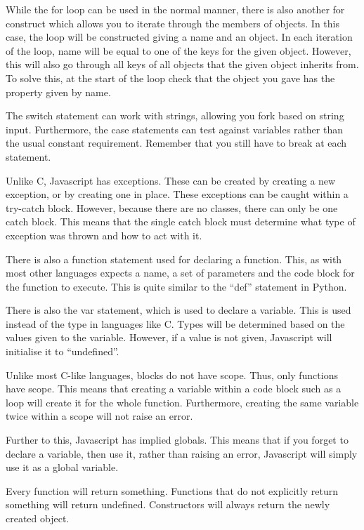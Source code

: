 			While the for loop can be used in the normal manner, 
			there is also another for construct which allows you to iterate through the members of objects. 
			In this case, the loop will be constructed giving a name and an object. 
			In each iteration of the loop, name will be equal to one of the keys for the given object. 
			However, this will also go through all keys of all objects that the given object inherits from. 
			To solve this, at the start of the loop check that the object you gave has the property given by name. 

			The switch statement can work with strings, allowing you fork based on string input. 
			Furthermore, the case statements can test against variables rather than the usual constant requirement. 
			Remember that you still have to break at each statement. 

			Unlike C, Javascript has exceptions. 
			These can be created by creating a new exception, or by creating one in place. 
			These exceptions can be caught within a try-catch block. 
			However, because there are no classes, there can only be one catch block. 
			This means that the single catch block must determine what type of exception was thrown and how to act with it. 

			There is also a function statement used for declaring a function. 
			This, as with most other languages expects a name, a set of parameters and the code block for the function to execute. 
			This is quite similar to the ``def'' statement in Python. 

			There is also the var statement, which is used to declare a variable. 
			This is used instead of the type in languages like C. 
			Types will be determined based on the values given to the variable.
			However, if a value is not given, Javascript will initialise it to ``undefined''. 

			Unlike most C-like languages, blocks do not have scope. 
			Thus, only functions have scope. 
			This means that creating a variable within a code block such as a loop will create it for the whole function. 
			Furthermore, creating the same variable twice within a scope will not raise an error. 

			Further to this, Javascript has implied globals. 
			This means that if you forget to declare a variable, then use it, 
			rather than raising an error, Javascript will simply use it as a global variable. 

			Every function will return something. 
			Functions that do not explicitly return something will return undefined. 
			Constructors will always return the newly created object. 

